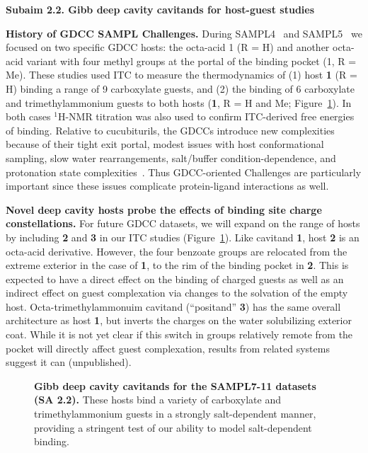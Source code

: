 \documentclass[11pt]{article}
\begin{document}
\textbf{Subaim 2.2. Gibb deep cavity cavitands for host-guest studies} 

{\bf History of GDCC SAMPL Challenges.} During SAMPL4~\cite{gibb_binding_2013} and SAMPL5~\cite{sullivan_binding_2016} we focused on two specific GDCC hosts: the octa-acid 1 (R = H) and another octa-acid variant with four methyl groups at the portal of the binding pocket (1, R = Me). 
These studies used ITC to measure the thermodynamics of (1) host {\bf 1} (R = H) binding a range of 9 carboxylate guests,
and (2) the binding of 6 carboxylate and trimethylammonium guests to both hosts ({\bf 1}, R = H and Me; Figure~\ref{figure:gdccs}).  
In both cases $^1$H-NMR titration was also used to confirm ITC-derived free energies of binding.  
Relative to cucubiturils, the GDCCs introduce new complexities because of their tight exit portal, modest issues with host conformational sampling, slow water rearrangements, salt/buffer condition-dependence, and protonation state complexities~\cite{Mobley:2017:AnnualReviewofBiophysics, yin_overview_2016}.
Thus GDCC-oriented Challenges are particularly important since these issues complicate protein-ligand interactions as well.

{\bf Novel deep cavity hosts probe the effects of binding site charge constellations.} 
For future GDCC datasets, we will expand on the range of hosts by including {\bf 2} and {\bf 3} in our ITC studies (Figure~\ref{figure:gdccs}).  
Like cavitand {\bf 1}, host {\bf 2} is an octa-acid derivative.  
However, the four benzoate groups are relocated from the extreme exterior in the case of {\bf 1}, to the rim of the binding pocket in {\bf 2}.  
This is expected to have a direct effect on the binding of charged guests as well as an indirect effect on guest complexation via changes to the solvation of the empty host.  
Octa-trimethylammonuim cavitand (``positand'' {\bf 3}) has the same overall architecture as host {\bf 1}, but inverts the charges on the water solubilizing exterior coat.  
While it is not yet clear if this switch in groups relatively remote from the pocket will directly affect guest complexation, results from related systems suggest it can (unpublished). 

\begin{figure}[h]
\vspace{-0.1in}
\begin{centering}

\end{centering}

\vspace{-0.15in}
\caption{\footnotesize {\bf Gibb deep cavity cavitands for the SAMPL7-11 datasets (SA 2.2).} These hosts bind a variety of carboxylate and trimethylammonium guests in a strongly salt-dependent manner, providing a stringent test of our ability to model salt-dependent binding.
\label{figure:gdccs}
\vspace{-0.1in}
}
\end{figure}
\end{document}
